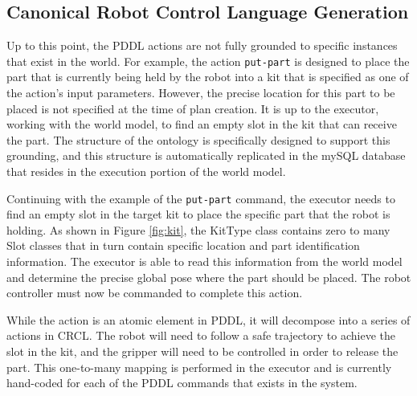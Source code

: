 \subsection{Canonical Robot Control Language Generation}
Up to this point, the PDDL actions are not fully grounded to specific instances
that exist in the world. For example, the action \texttt{put-part} is designed
to place the part that is currently being held by the robot into a kit that
is specified as one of the action's input parameters. However, the precise
location for this part to be placed is not specified at the time of plan
creation. It is up to the executor, working with the world model, to find
an empty slot in the kit that can receive the part. The structure of the
ontology is specifically designed to support this grounding, and this
structure is automatically replicated in the mySQL database that resides
in the execution portion of the world model. 

Continuing with
the example of the \texttt{put-part} command, the executor needs to find
an empty slot in the target kit to place the specific part that the robot is
holding. As shown in Figure \ref{fig:kit}, the {\sc KitType} class contains
zero to many {\sc Slot} classes that in turn contain specific location and 
part identification information. The executor is able to read this information
from the world model and determine the precise global pose where the part
should be placed. The robot controller must now be commanded to complete this action.

While the action is an atomic element in PDDL, it will decompose into a series
of actions in CRCL. The robot will need to follow a safe trajectory to achieve
the slot in the kit, and the gripper will need to be controlled in order to release
the part. This one-to-many mapping is performed in the executor and is currently
hand-coded for each of the PDDL commands that exists in the system. 
%
